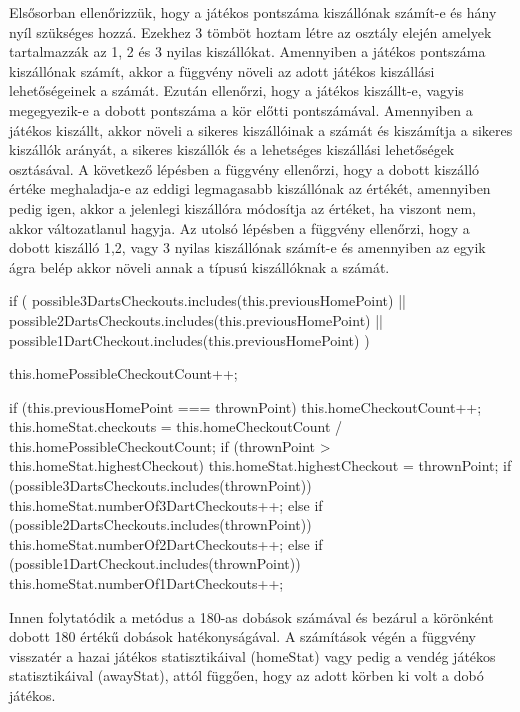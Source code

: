 Elsősorban ellenőrizzük, hogy a játékos pontszáma kiszállónak számít-e és hány nyíl szükséges hozzá. Ezekhez 3 tömböt hoztam létre az osztály elején amelyek tartalmazzák az 1, 2 és 3 nyilas kiszállókat. Amennyiben a játékos pontszáma kiszállónak számít, akkor a függvény növeli az adott játékos kiszállási lehetőségeinek a számát. Ezután ellenőrzi, hogy a játékos kiszállt-e, vagyis megegyezik-e a dobott pontszáma a kör előtti pontszámával. Amennyiben a játékos kiszállt, akkor növeli a sikeres kiszállóinak a számát és kiszámítja a sikeres kiszállók arányát, a sikeres kiszállók és a lehetséges kiszállási lehetőségek osztásával. A következő lépésben a függvény ellenőrzi, hogy a dobott kiszálló értéke meghaladja-e az eddigi legmagasabb kiszállónak az értékét, amennyiben pedig igen, akkor a jelenlegi kiszállóra módosítja az értéket, ha viszont nem, akkor változatlanul hagyja. Az utolsó lépésben a függvény ellenőrzi, hogy a dobott kiszálló 1,2, vagy 3 nyilas kiszállónak számít-e és amennyiben az egyik ágra belép akkor növeli annak a típusú kiszállóknak a számát.

\begin{cpp}      
      if (
        possible3DartsCheckouts.includes(this.previousHomePoint) ||
        possible2DartsCheckouts.includes(this.previousHomePoint) ||
        possible1DartCheckout.includes(this.previousHomePoint)
      ) {
        this.homePossibleCheckoutCount++;
        
        if (this.previousHomePoint === thrownPoint) {
          this.homeCheckoutCount++;
          this.homeStat.checkouts =
            this.homeCheckoutCount / this.homePossibleCheckoutCount;
          if (thrownPoint > this.homeStat.highestCheckout) {
            this.homeStat.highestCheckout = thrownPoint;
          }
          if (possible3DartsCheckouts.includes(thrownPoint)) {
            this.homeStat.numberOf3DartCheckouts++;
          } else if (possible2DartsCheckouts.includes(thrownPoint)) {
            this.homeStat.numberOf2DartCheckouts++;
          } else if (possible1DartCheckout.includes(thrownPoint)) {
            this.homeStat.numberOf1DartCheckouts++;
          }
        }
      }
      
\end{cpp}

Innen folytatódik a metódus a 180-as dobások számával és bezárul a körönként dobott 180 értékű dobások hatékonyságával. A számítások végén a függvény visszatér a hazai játékos statisztikáival (homeStat) vagy pedig a vendég játékos statisztikáival (awayStat), attól függően, hogy az adott körben ki volt a dobó játékos.

